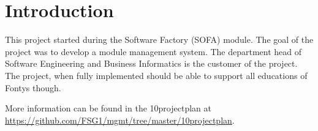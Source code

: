 \chapter{Introduction}
\label{ch:intro}

This project started during the Software Factory (SOFA) module. The goal of the project was to develop a module management system.
The department head of Software Engineering and Business Informatics is the customer of the project. 
The project, when fully implemented should be able to support all educations of Fontys though.

More information can be found in the 10projectplan at \url{https://github.com/FSG1/mgmt/tree/master/10projectplan}.